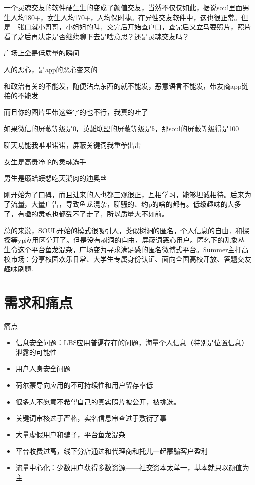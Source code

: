 \documentclass[UTF8]{ctexart}
\begin{document}
\begin{tcolorbox}
    一个灵魂交友的软件硬生生的变成了颜值交友，当然不仅仅如此，据说soul里面男生人均180+，女生人均170+，人均保时捷。在异性交友软件中，这也很正常。但是一张口就小哥哥，小姐姐的叫，交完后开始查户口，查完后又立马要照片，照片看了之后再决定是否继续聊下去是啥意思？还是灵魂交友吗？

    广场上全是低质量的瞬间

    人的恶心，是app的恶心变来的

    和政治有关的不能发，随便沾点东西的就不能发，恶意语言不能发，带友商app链接的不能发

    而且你的图片里带这些字的也不行，我真的吐了

    如果微信的屏蔽等级是0，英雄联盟的屏蔽等级是5，那soul的屏蔽等级得是100

    聊天功能我唯唯诺诺，屏蔽关键词我重拳出击

    女生是高贵冷艳的灵魂选手

    男生是癞蛤蟆想吃天鹅肉的迪奥丝

    刚开始为了口碑，而且进来的人也都三观很正，互相学习，能够坦诚相待。后来为了流量，大量广告，导致鱼龙混杂，聊骚的、约p的啥的都有。低级趣味的人多了，有趣的灵魂也都受不了走了，所以质量大不如前。\cite{Soul}
\end{tcolorbox}

总的来说，SOUL开始的模式很吸引人，类似树洞的匿名，个人信息的自由，和探探等yp应用区分开了。但是没有树洞的自由，屏蔽词恶心用户。匿名下的乱象丛生令这个平台鱼龙混杂，广场变为寻求满足感的匿名微博式平台。Summer主打高校市场：分享校园欢乐日常、大学生专属身份认证、面向全国高校开放、答题交友趣味刷题.

\section{需求和痛点}
痛点
\begin{itemize}
    \item 信息安全问题：LBS应用普遍存在的问题，海量个人信息（特别是位置信息）泄露的可能性
    \item 用户人身安全问题
    \item 荷尔蒙导向应用的不可持续性和用户留存率低
    \item 很多人不愿意不希望自己的真实照片被公开，被挑选。
    \item 关键词审核过于严格，实名信息审查过于敷衍了事
    \item 大量虚假用户和骗子，平台鱼龙混杂
    \item 平台收费过高，线下分店通过和代理商和托儿一起蒙骗客户盈利
    \item 流量中心化：少数用户获得多数资源——社交资本太单一，基本就只以颜值为主
\end{itemize}
\end{document}
